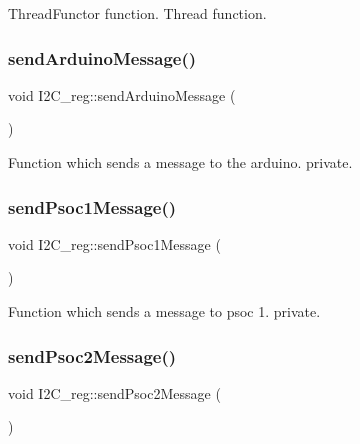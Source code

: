 Thread\+Functor function. Thread function. 

\mbox{\label{class_i2_c__reg_aa95ab17a2bba34006b163f245513dd18}} 
\subsubsection{\texorpdfstring{send\+Arduino\+Message()}{sendArduinoMessage()}}
{\footnotesize\ttfamily void I2\+C\+\_\+reg\+::send\+Arduino\+Message (\begin{DoxyParamCaption}{ }\end{DoxyParamCaption})\hspace{0.3cm}{\ttfamily [private]}}



Function which sends a message to the arduino. private. 

\mbox{\label{class_i2_c__reg_ad7edf2735cca77a30cd694105c45866a}} 
\subsubsection{\texorpdfstring{send\+Psoc1\+Message()}{sendPsoc1Message()}}
{\footnotesize\ttfamily void I2\+C\+\_\+reg\+::send\+Psoc1\+Message (\begin{DoxyParamCaption}{ }\end{DoxyParamCaption})\hspace{0.3cm}{\ttfamily [private]}}



Function which sends a message to psoc 1. private. 

\mbox{\label{class_i2_c__reg_a6776bfe77df2a4de2c0e53071d972993}} 
\subsubsection{\texorpdfstring{send\+Psoc2\+Message()}{sendPsoc2Message()}}
{\footnotesize\ttfamily void I2\+C\+\_\+reg\+::send\+Psoc2\+Message (\begin{DoxyParamCaption}{ }\end{DoxyParamCaption})\hspace{0.3cm}{\ttfamily [private]}}



